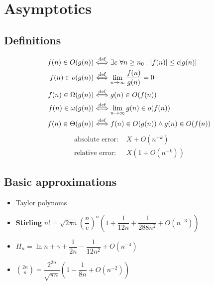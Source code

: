 \section{Asymptotics}
\subsection{Definitions}
\begin{align*}
f(n) \in O(g(n)) &\overset{\text{def}}{\Longleftrightarrow} \exists c ~ \forall n \geq n_0 : |f(n)| \leq c|g(n)|\\
f(n) \in o(g(n)) &\overset{\text{def}}{\Longleftrightarrow} \lim_{n \to \infty} \dfrac{f(n)}{g(n)} = 0 \\
f(n) \in \Omega(g(n)) &\overset{\text{def}}{\Longleftrightarrow} g(n) \in O(f(n))\\
f(n) \in \omega(g(n)) &\overset{\text{def}}{\Longleftrightarrow} \lim_{n \to \infty} g(n) \in o(f(n)) \\
f(n) \in \Theta(g(n)) &\overset{\text{def}}{\Longleftrightarrow} f(n) \in O(g(n)) \wedge g(n) \in O(f(n)) \\
\end{align*}
\begin{align*}
\text{absolute error: }& X + O(n^{-k})\\
\text{relative error: }& X (1 + O(n^{-k}))
\end{align*}

\subsection{Basic approximations}
\begin{itemize}
\item Taylor polynoms 
\item \textbf{Stirling} $n! = \sqrt{2 \pi n} \left( \dfrac{n}{e} \right)^n \left(1 + \dfrac{1}{12n} + \dfrac{1}{288n^2} + O(n^{-3}) \right)$
\item $H_n = \ln n + \gamma + \dfrac{1}{2n} - \dfrac{1}{12n^2} + O(n^{-4})$
\item ${2n \choose n} = \dfrac{2^{2n}}{\sqrt{\pi n}} \left( 1 - \dfrac{1}{8n} + O\left(n^{-2}\right) \right)$
\end{itemize}
